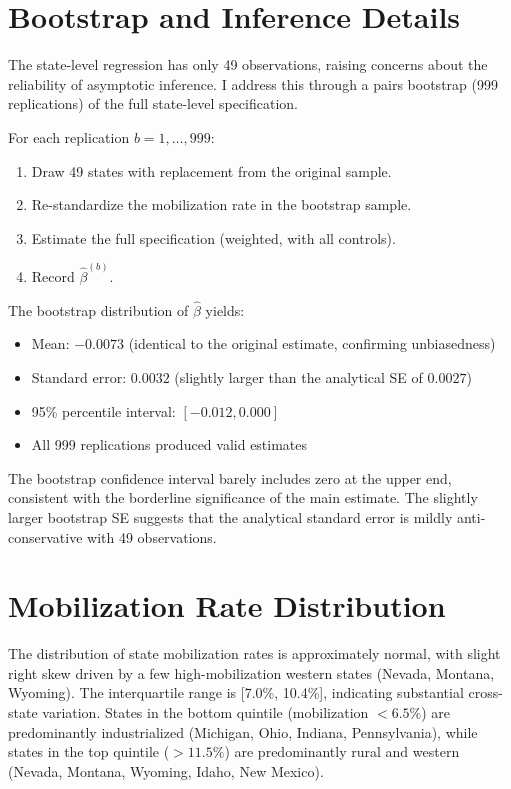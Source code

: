 \documentclass[12pt]{article}
\begin{document}
\section{Bootstrap and Inference Details}
\label{app:bootstrap}

The state-level regression has only 49 observations, raising concerns about the reliability of asymptotic inference. I address this through a pairs bootstrap (999 replications) of the full state-level specification.

For each replication $b = 1, \ldots, 999$:
\begin{enumerate}
\item Draw 49 states with replacement from the original sample.
\item Re-standardize the mobilization rate in the bootstrap sample.
\item Estimate the full specification (weighted, with all controls).
\item Record $\hat{\beta}^{(b)}$.
\end{enumerate}

The bootstrap distribution of $\hat{\beta}$ yields:
\begin{itemize}
\item Mean: $-0.0073$ (identical to the original estimate, confirming unbiasedness)
\item Standard error: $0.0032$ (slightly larger than the analytical SE of $0.0027$)
\item 95\% percentile interval: $[-0.012, 0.000]$
\item All 999 replications produced valid estimates
\end{itemize}

The bootstrap confidence interval barely includes zero at the upper end, consistent with the borderline significance of the main estimate. The slightly larger bootstrap SE suggests that the analytical standard error is mildly anti-conservative with 49 observations.


\section{Mobilization Rate Distribution}
\label{app:mob_rates}

The distribution of state mobilization rates is approximately normal, with slight right skew driven by a few high-mobilization western states (Nevada, Montana, Wyoming). The interquartile range is [7.0\%, 10.4\%], indicating substantial cross-state variation. States in the bottom quintile (mobilization $< 6.5\%$) are predominantly industrialized (Michigan, Ohio, Indiana, Pennsylvania), while states in the top quintile ($> 11.5\%$) are predominantly rural and western (Nevada, Montana, Wyoming, Idaho, New Mexico).
\end{document}
